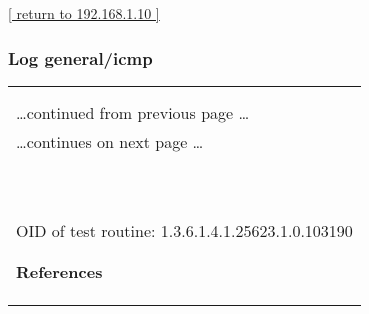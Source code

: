 \documentclass{article}
\begin{document}
\begin{footnotesize}\hyperref[host:192.168.1.10]{[ return to 192.168.1.10 ]}\end{footnotesize}
\subsubsection{Log general/icmp}
\label{port:192.168.1.10 general/icmp Log}

\begin{longtable}{|p{}|}
\hline
\rowcolor{openvas_log}{\color{white}{Log (CVSS: 0.0) }}\\
\rowcolor{openvas_log}{\color{white}{NVT: ICMP Timestamp Detection}}\\
\hline
\endfirsthead
\hfill\ldots continued from previous page \ldots \\
\hline
\endhead
\hline
\ldots continues on next page \ldots \\
\endfoot
\hline
\endlastfoot
\\
\rowcolor{white}{\verb= Summary:=}\\
\rowcolor{white}{\verb= The remote host responded to an ICMP timestamp request. The Timestamp Reply is=}\\
\rowcolor{white}{\verb=an ICMP message which replies to a Timestamp message. It consists of the=}\\
\rowcolor{white}{\verb=originating timestamp sent by the sender of the Timestamp as well as a receive=}\\
\rowcolor{white}{\verb=timestamp and a transmit timestamp. This information could theoretically be used=}\\
\rowcolor{white}{\verb=to exploit weak time-based random number generators in other services.=}\\
\rowcolor{white}{\verb==}\\
\rowcolor{white}{\verb==}\\
\\
OID of test routine: 1.3.6.1.4.1.25623.1.0.103190\\
\\

      \hline
      \\
\textbf{References}\\
\rowcolor{white}{\verb=CVE: CVE-1999-0524=}\\
\rowcolor{white}{\verb=Other:=}\\
\rowcolor{white}{\verb=  URL:http://www.ietf.org/rfc/rfc0792.txt=}\\
\end{longtable}
\end{document}
